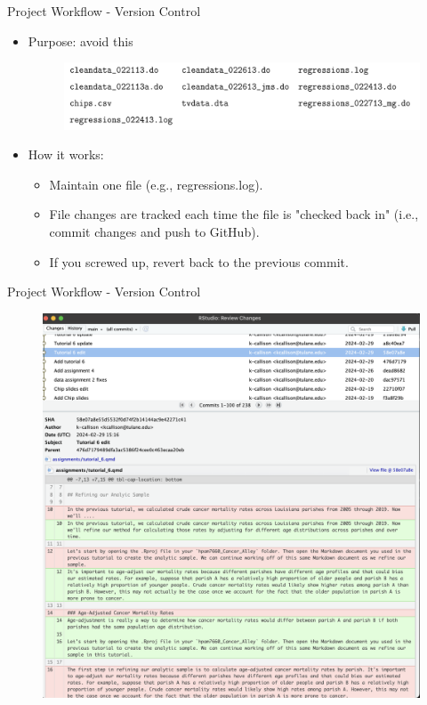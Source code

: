 \documentclass{beamer}
\begin{document}
\begin{frame}{Project Workflow - Version Control}
    \begin{itemize}
        \item Purpose: avoid this
            \begin{figure}
                \includegraphics[scale=0.55]{files.png}
            \end{figure}
        \bigskip
        \item How it works:
            \begin{itemize}
                \item Maintain one file (e.g., regressions.log).
                \item File changes are tracked each time the file is "checked back in" (i.e., commit changes and push to GitHub).
                \item If you screwed up, revert back to the previous commit.
            \end{itemize}
    \end{itemize}
\end{frame}

\begin{frame}{Project Workflow - Version Control}
    \begin{figure}
        \includegraphics[scale=0.25]{version_control.png}
    \end{figure}    
\end{frame}
\end{document}
